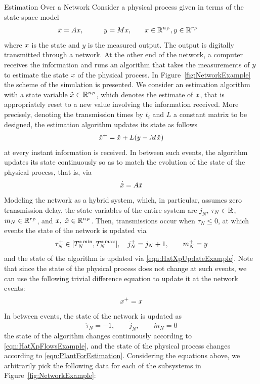 \begin{example}{Estimation Over a Network}\label{ex:Estimation}
Consider a physical process given in terms of the state-space model
\begin{equation}
\begin{aligned}
\label{eqn:PlantForEstimation}
&\xpdot=A \xp ,\qquad 
&\yp= M \xp, \qquad & \xp \in \reals^{n_P}, \yp \in \reals^{r_P}
\end{aligned}
\end{equation}
where $x$ is the state and $y$ is the measured output.
The output is digitally transmitted through a network.
At the other end of the network, a computer receives the information
and runs an algorithm that takes the measurements of 
$y$ to estimate the state $x$ of the physical process.
In Figure~\ref{fig:NetworkExample} the scheme of the simulation is presented.
We consider an estimation algorithm with a state variable $\hat{x} \in {\mathbb R}^{n_P}$,
which denotes the estimate of $x$, that is appropriately reset
to a new value involving the information received.
More precisely, denoting the transmission times by $t_i$
and $L$ a constant matrix to be designed,
the estimation algorithm updates its state as follows
\begin{equation}\label{eqn:HatXpUpdateExample}
\hat\xp^+=\hat\xp+L(\yp-M\hat\xp)
\end{equation}
at every instant information is received.
In between such events, the algorithm
updates its state continuously so as to match the evolution
of the state of the physical process, that is, via
\begin{equation}\label{eqn:HatXpFlowsExample}
\dot{\hat\xp} = A \hat\xp
\end{equation}
Modeling the network as a hybrid system,
which, in particular, assumes zero transmission delay,
the state variables of the entire system are 
$j_N$, $\tau_N \in {\mathbb R}$, $m_N \in {\mathbb R}^{r_P}$, and $x,\ \hat{x}\in {\mathbb R}^{n_P}$.  
Then, transmissions occur when $\tau_N \leq 0$, 
at which events the state of the network is updated via
$$
\tau_N^+ \in [T^{*\min}_{N},T^{*\max}_{N}],\quad j_N^+ = j_N+1, \qquad m_N^+ = y
$$
and the state of the algorithm is updated via \eqref{eqn:HatXpUpdateExample}.
Note that since the state of the physical process does not change at such
events, we can use the following trivial difference equation to update it at the
network events:
$$
x^+ = x
$$
In between events, the state of the network is updated as
$$
\dot{\tau}_N = -1, \qquad \dot{j}_N, \qquad \dot{m}_N = 0
$$
the state of the algorithm changes continuously according to \eqref{eqn:HatXpFlowsExample}, and the 
state of the physical process changes according to \eqref{eqn:PlantForEstimation}.
Considering the equations above, we arbitrarily pick the following data for each of the subsystems in Figure~\ref{fig:NetworkExample}:


\end{example}
